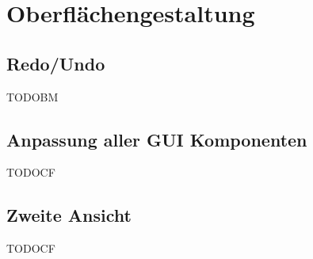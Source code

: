 

\chapter{Oberflächengestaltung}\label{GUI}


\section{Redo/Undo}

TODOBM


\section{Anpassung aller GUI Komponenten}

TODOCF


\section{Zweite Ansicht}

TODOCF